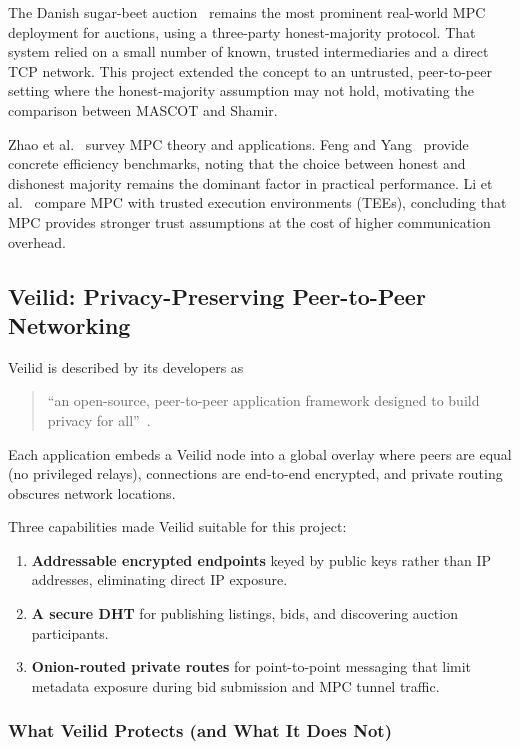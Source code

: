 The Danish sugar-beet auction~\cite{bogetoft2009_mpc_live} remains the most
prominent real-world MPC deployment for auctions, using a three-party
honest-majority protocol.  That system relied on a small number of known,
trusted intermediaries and a direct TCP network.  This project extended the
concept to an untrusted, peer-to-peer setting where the honest-majority
assumption may not hold, motivating the comparison between MASCOT and Shamir.

Zhao et al.~\cite{zhao2019_secure_mpc} survey MPC theory and applications.
Feng and Yang~\cite{feng2022_concretely_efficient_mpc} provide concrete
efficiency benchmarks, noting that the choice between honest and dishonest
majority remains the dominant factor in practical performance.  Li et
al.~\cite{li2023_secure_comp_tee_survey} compare MPC with trusted execution
environments (TEEs), concluding that MPC provides stronger trust assumptions
at the cost of higher communication overhead.

\subsection{Veilid: Privacy-Preserving Peer-to-Peer Networking}
\label{sec:ctx-veilid}

Veilid is described by its developers as
\begin{quote}
``an open-source, peer-to-peer application framework designed to build
privacy for all''~\cite{veilid_website}.
\end{quote}
Each application embeds a Veilid node into a global overlay where peers are
equal (no privileged relays), connections are end-to-end encrypted, and
private routing obscures network locations.

Three capabilities made Veilid suitable for this project:
\begin{enumerate}[noitemsep]
  \item \textbf{Addressable encrypted endpoints} keyed by public keys rather
    than IP addresses, eliminating direct IP exposure.
  \item \textbf{A secure DHT} for publishing listings, bids, and discovering
    auction participants.
  \item \textbf{Onion-routed private routes} for point-to-point messaging
    that limit metadata exposure during bid submission and MPC tunnel traffic.
\end{enumerate}

\subsubsection{What Veilid Protects (and What It Does Not)}
\label{sec:ctx-veilid-security}

